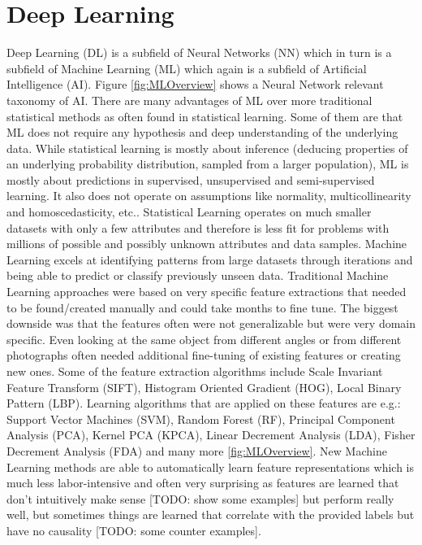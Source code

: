 \chapter{Deep Learning}

Deep Learning (DL) is a subfield of Neural Networks (NN) which in turn is a subfield of Machine Learning (ML) which again is a subfield of Artificial Intelligence (AI). Figure \ref{fig:MLOverview} shows a Neural Network relevant taxonomy of AI. There are many advantages of ML over more traditional statistical methods as often found in statistical learning. Some of them are that ML does not require any hypothesis and deep understanding of the underlying data. While statistical learning is mostly about inference (deducing properties of an underlying probability distribution, sampled from a larger population), ML is mostly about predictions in supervised, unsupervised and semi-supervised learning. It also does not operate on assumptions like normality, multicollinearity and homoscedasticity, etc.. Statistical Learning operates on much smaller datasets with only a few attributes and therefore is less fit for problems with millions of possible and possibly unknown attributes and data samples. Machine Learning excels at identifying patterns from large datasets through iterations and being able to predict or classify previously unseen data.
Traditional Machine Learning approaches were based on very specific feature extractions that needed to be found/created manually and could take months to fine tune. The biggest downside was that the features often were not generalizable but were very domain specific. Even looking at the same object from different angles or from different photographs often needed additional fine-tuning of existing features or creating new ones. Some of the feature extraction algorithms include Scale Invariant Feature Transform (SIFT), Histogram Oriented Gradient (HOG), Local Binary Pattern (LBP). Learning algorithms that are applied on these features are e.g.: Support Vector Machines (SVM), Random Forest (RF), Principal Component Analysis (PCA), Kernel PCA (KPCA), Linear Decrement Analysis (LDA), Fisher Decrement Analysis (FDA) and many more \ref{fig:MLOverview}. New Machine Learning methods are able to automatically learn feature representations which is much less labor-intensive and often very surprising as features are learned that don't intuitively make sense [TODO: show some examples] but perform really well, but sometimes things are learned that correlate with the provided labels but have no causality [TODO: some counter examples].

